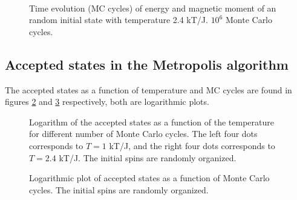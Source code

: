 \documentclass{emulateapj}
\begin{document}
\begin{figure}
 \\
\caption{Time evolution (MC cycles) of energy and magnetic moment of an random initial state with temperature 2.4 kT/J. $10^6$ Monte Carlo cycles.}
\label{fig:EM-T2.4}
\end{figure}

\subsection{Accepted states in the Metropolis algorithm}
The accepted states as a function of temperature and MC cycles are found in figures \ref{fig:logAccepts(t)} and \ref{fig:logAccepts} respectively, both are logarithmic plots.
\begin{figure}
\mbox{}
\caption{Logarithm of the accepted states as a function of the temperature for different number of Monte Carlo cycles. The left four dots corresponds to $T=1$ kT/J, and the right four dots corresponds to $T=2.4$ kT/J. The initial spins are randomly organized.}
\label{fig:logAccepts(t)}
\end{figure}
\begin{figure}
\mbox{}
\caption{Logarithmic plot of accepted states as a function of Monte Carlo cycles. The initial spins are randomly organized.}
\label{fig:logAccepts}
\end{figure}
\end{document}
